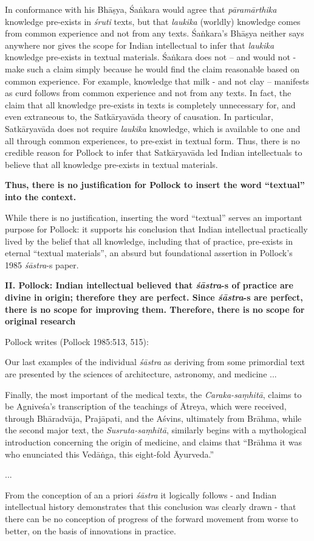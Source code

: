 In conformance with his Bhāṣya, Śaṅkara would agree that {\sl pāramārthika} knowledge pre-exists in {\sl śruti} texts, but that {\sl laukika} (worldly) knowledge comes from common experience and not from any texts. Śaṅ\-kara's Bhāṣya neither says anywhere nor gives the scope for Indian intellectual to infer that {\sl laukika} knowledge pre-exists in textual materials.  Śaṅkara does not -- and would not - make such a claim simply because he would find the claim reasonable based on common experience. For example, knowledge that milk - and not clay -- manifests as curd follows from common experience and not from any texts. In fact, the claim that all knowledge pre-exists in texts is completely unnecessary for, and even extraneous to, the Satkāryavāda theory of causation. In particular, Satkāryavāda does not require {\sl laukika} knowledge, which is available to one and all through common experiences, to pre-exist in textual form. Thus, there is no credible reason for Pollock to infer that Satkāryavāda led Indian intellectuals to believe that all knowledge pre-exists in textual materials.

\textbf{Thus, there is no justification for Pollock to insert the word ``textual'' into the context.}

While there is no justification, inserting the word ``textual'' serves an important purpose for Pollock: it supports his conclusion that Indian intellectual practically lived by the belief that all knowledge, including that of practice, pre-exists in eternal ``textual materials'', an absurd but foundational assertion in Pollock's 1985 {\sl śāstra}-s paper.

\newpage

{\bf II. Pollock: Indian intellectual believed that {{\sl\bfseries śāstra}\relax}-s of practice are divine in origin; therefore they are perfect. Since {{\sl\bfseries śāstra}\relax}-s are perfect, there is no scope for improving them. Therefore, there is no scope for original research}

Pollock writes (Pollock 1985:513, 515):
\begin{myquote}
Our last examples of the individual {\sl śāstra} as deriving from some primordial text are presented by the sciences of architecture, astronomy, and medicine ...

Finally, the most important of the medical texts, the {\sl Caraka-saṃhitā}, claims to be Agniveśa's transcription of the teachings of Ātreya, which were received, through Bhāradvāja, Prajāpati, and the Aśvins, ultimately from Brāhma, while the second major text, the {\sl Susruta-saṃhitā}, similarly begins with a mythological introduction concerning the origin of medicine, and claims that ``Brāhma it was who enunciated this Vedāṅga, this eight-fold Āyurveda.''

...

From the conception of an a priori {\sl śāstra} it logically follows - and Indian intellectual history demonstrates that this conclusion was clearly drawn - that there can be no conception of progress of the forward movement from worse to better, on the basis of innovations in practice. 
\end{myquote}

